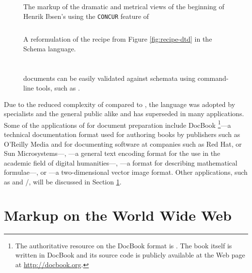 \documentclass{book}
\begin{document}
\begin{figure}[hb!]
  
  \caption{The markup of the dramatic and metrical views of the beginning of
    Henrik Ibsen's  using the \texttt{CONCUR} feature of
    }
\end{figure}


\begin{figure}[H]
  \inputminted{xml}{examples/02/recipe.xsd}
  \caption{A reformulation of the recipe  from Figure
    \ref{fig:recipe-dtd} in the  Schema 
    language.}
  \label{fig:recipe-xsd}
  \inputminted{text}{examples/02/recipe.rnc}
  \caption{A reformulation of the recipe  from Figure
    \ref{fig:recipe-dtd} in the compact syntax of .%
    }
  \label{fig:recipe-rnc}
  \inputminted{sh}{examples/02/recipe.sh}
  \caption{ documents can be easily validated against 
    schemata using command-line tools, such as .}
\end{figure}

Due to the reduced complexity of  compared to , the
language was adopted by specialists and the general public alike and has
superseded  in many applications. Some of the applications of
 for document preparation include DocBook%
\footnote{
  The authoritative resource on the DocBook  format is
  \cite{walsh10}. The book itself is written in DocBook and its source code is
  publicly available at the Web page at \url{http://docbook.org}.
}---a technical documentation format used for authoring books by publishers such
as O'Reilly Media and for documenting software at companies such as Red Hat,
 or Sun Microsystems---, ---a general text encoding
format for the use in the academic field of digital humanities---,
---a format for describing mathematical formulae---, or
---a two-dimensional vector image format. Other 
applications, such as  and /, will
be discussed in Section \ref{sec:www-markup}.
      
\section{Markup on the World Wide Web}\label{sec:www-markup}
\end{document}
